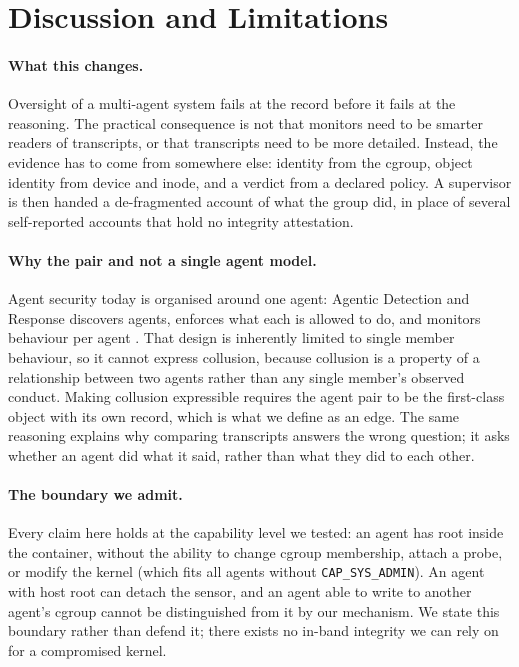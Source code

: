 \documentclass[11pt]{article}
\begin{document}
\section{Discussion and Limitations}

\paragraph{What this changes.} Oversight of a multi-agent system fails at the record
before it fails at the reasoning. The practical consequence is not that monitors need to
be smarter readers of transcripts, or that transcripts need to be more detailed.
Instead, the evidence has to come from somewhere else: identity from the cgroup, object
identity from device and inode, and a verdict from a declared policy. A supervisor is
then handed a de-fragmented account of what the group did, in place of several
self-reported accounts that hold no integrity attestation.

\paragraph{Why the pair and not a single agent model.} Agent security today is organised
around one agent: Agentic Detection and Response discovers agents, enforces what each is
allowed to do, and monitors behaviour per agent \cite{sentinelone2026adr}. That design
is inherently limited to single member behaviour, so it cannot express collusion,
because collusion is a property of a relationship between two agents rather than any
single member's observed conduct. Making collusion expressible requires the agent pair
to be the first-class object with its own record, which is what we define as an edge.
The same reasoning explains why comparing transcripts answers the wrong question; it
asks whether an agent did what it said, rather than what they did to each other.

\paragraph{The boundary we admit.} Every claim here holds at the capability level we
tested: an agent has root inside the container, without the ability to change cgroup
membership, attach a probe, or modify the kernel (which fits all agents without
\texttt{CAP\_SYS\_ADMIN}). An agent with host root can detach the sensor, and an agent
able to write to another agent's cgroup cannot be distinguished from it by our
mechanism. We state this boundary rather than defend it; there exists no in-band
integrity we can rely on for a compromised kernel.
\end{document}
